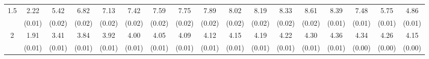 \documentclass[12pt]{article}  %
\theoremstyle{plain}
\begin{document}
\begin{sidewaystable}[htbp]
\begin{tabular}{ccccccccccccccccc}
\multirow{2}{*}{1.5}  &2.22 & 5.42 & 6.82 & 7.13  & 7.42 &  7.59  & 7.75  & 7.89  & 8.02 & 8.19 & 8.33 & 8.61 & 8.39&7.48 & 5.75 & 4.86\\
                      &  (0.01)& (0.02)& (0.02)& (0.02)& (0.02)& (0.02)& (0.02)& (0.02)& (0.02)&  (0.02)&  (0.02)&  (0.02)&  (0.01)&  (0.01)&  (0.01) &(0.01)\\ \hline                                                                                                                                                                                                                                                                                    
\multirow{2}{*}{2}  &1.91 & 3.41 & 3.84  &3.92 &  4.00 &  4.05  & 4.09  & 4.12  & 4.15 & 4.19 & 4.22 & 4.30&  4.36&4.34  &4.26 & 4.15\\
                      &  (0.01)& (0.01)& (0.01)& (0.01)& (0.01)& (0.01)& (0.01)& (0.01)& (0.01)&  (0.01)&  (0.01)&  (0.01)&  (0.01)&  (0.00)&  (0.00)&(0.00)\\ \hline                                                                                                                                                                                                                                                                                    
\end{tabular}
\end{sidewaystable}
\end{document}
